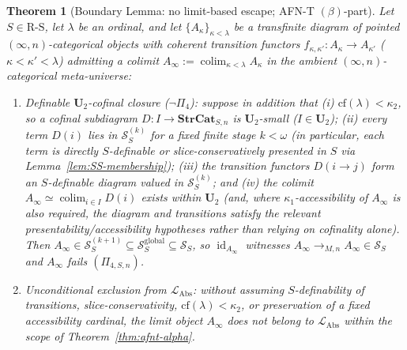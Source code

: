 \documentclass[11pt]{article}
\theoremstyle{plain}
\newtheorem{theorem}{Theorem}[section]
\theoremstyle{definition}
\newcommand{\RS}{\mathrm{R\text{-}S}}
\newcommand{\cS}{\mathcal{S}}
\newcommand{\LAbs}{\mathcal{L}_{\mathrm{Abs}}}
\DeclareMathOperator{\colim}{colim}
\DeclareMathOperator{\id}{id}
\begin{document}
\begin{theorem}[Boundary Lemma: no limit-based escape; AFN-T $(\beta)$-part]\label{thm:afnt-beta}
Let $S \in \RS$, let $\lambda$ be an ordinal, and let $\{A_\kappa\}_{\kappa < \lambda}$ be a transfinite diagram of pointed $(\infty, n)$-categorical objects with coherent transition functors $f_{\kappa, \kappa'} : A_\kappa \to A_{\kappa'}$ ($\kappa < \kappa' < \lambda$) admitting a colimit $A_\infty := \colim_{\kappa < \lambda} A_\kappa$ in the ambient $(\infty, n)$-categorical meta-universe:
\begin{enumerate}[nosep,label=(\alph*)]
\item \emph{Definable $\mathbf{U}_2$-cofinal closure ($\neg\Pi_4$)}: suppose in addition that (i) $\mathrm{cf}(\lambda) < \kappa_2$, so a cofinal subdiagram $D : I \to \mathbf{StrCat}_{S, n}$ is $\mathbf{U}_2$-small ($I \in \mathbf{U}_2$); (ii) every term $D(i)$ lies in $\cS_S^{(k)}$ for a fixed finite stage $k < \omega$ (in particular, each term is directly $S$-definable or slice-conservatively presented in $S$ via Lemma~\ref{lem:SS-membership}); (iii) the transition functors $D(i \to j)$ form an $S$-definable diagram valued in $\cS_S^{(k)}$; and (iv) the colimit $A_\infty \simeq \colim_{i \in I} D(i)$ exists within $\mathbf{U}_2$ (and, where $\kappa_1$-accessibility of $A_\infty$ is also required, the diagram and transitions satisfy the relevant presentability/accessibility hypotheses rather than relying on cofinality alone). Then $A_\infty \in \cS_S^{(k+1)} \subseteq \cS_S^{\mathrm{global}} \subseteq \cS_S$, so $\id_{A_\infty}$ witnesses $A_\infty \to_{M, n} A_\infty \in \cS_S$ and $A_\infty$ fails $(\Pi_{4, S, n})$.
\item \emph{Unconditional exclusion from $\LAbs$}: without assuming $S$-definability of transitions, slice-conservativity, $\mathrm{cf}(\lambda) < \kappa_2$, or preservation of a fixed accessibility cardinal, the limit object $A_\infty$ does not belong to $\LAbs$ within the scope of Theorem~\ref{thm:afnt-alpha}.
\end{enumerate}
\end{theorem}
\end{document}
